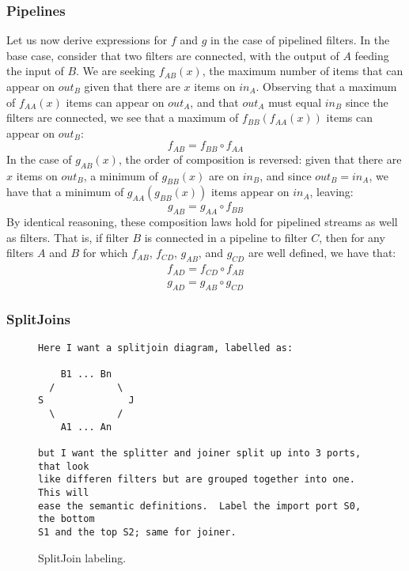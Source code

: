\subsubsection{Pipelines}

Let us now derive expressions for $f$ and $g$ in the case of pipelined
filters.  In the base case, consider that two filters are connected,
with the output of $A$ feeding the input of $B$.  We are seeking
$f_{AB}(x)$, the maximum number of items that can appear on $out_B$
given that there are $x$ items on $in_A$.  Observing that a maximum of
$f_{AA}(x)$ items can appear on $out_A$, and that $out_A$ must equal
$in_B$ since the filters are connected, we see that a maximum of
$f_{BB}(f_{AA}(x))$ items can appear on $out_B$:
\begin{equation*}
f_{AB} = f_{BB} \circ f_{AA}
\end{equation*}
In the case of $g_{AB}(x)$, the order of composition is reversed:
given that there are $x$ items on $out_B$, a minimum of $g_{BB}(x)$
are on $in_B$, and since $out_B = in_A$, we have that a minimum of
$g_{AA}(g_{BB}(x))$ items appear on $in_A$, leaving:
\begin{equation*}
g_{AB} = g_{AA} \circ f_{BB}
\end{equation*}
By identical reasoning, these composition laws hold for pipelined
streams as well as filters.  That is, if filter $B$ is connected in a
pipeline to filter $C$, then for any filters $A$ and $B$ for which
$f_{AB}$, $f_{CD}$, $g_{AB}$, and $g_{CD}$ are well defined, we have that:
\begin{eqnarray*}
f_{AD} = f_{CD} \circ f_{AB} \\
g_{AD} = g_{AB} \circ g_{CD}
\end{eqnarray*}

\subsubsection{SplitJoins}

\begin{figure}[t]
\scriptsize
\begin{verbatim}
Here I want a splitjoin diagram, labelled as:

    B1 ... Bn 
  /           \
S               J
  \           /
    A1 ... An

but I want the splitter and joiner split up into 3 ports, that look
like differen filters but are grouped together into one.  This will
ease the semantic definitions.  Label the import port S0, the bottom
S1 and the top S2; same for joiner.  

\end{verbatim}
\vspace{-12pt}
\caption{\protect\small SplitJoin labeling.
\protect\label{splitjoin}}
\vspace{-12pt}
\end{figure}

